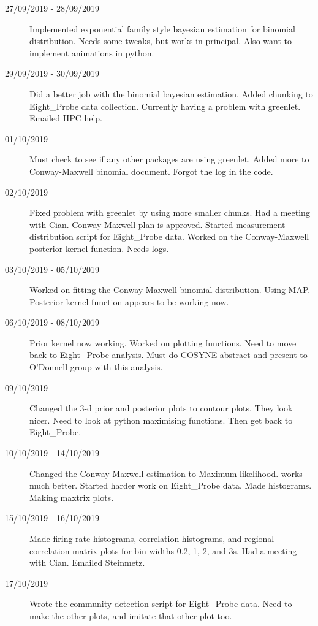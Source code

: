\documentclass[a4paper,12pt]{article}
\theoremstyle{definition}
\begin{document}
\begin{description}
	\item[27/09/2019 - 28/09/2019] Implemented exponential family style bayesian estimation for binomial distribution. Needs some tweaks, but works in principal. Also want to implement animations in python.

	\item[29/09/2019 - 30/09/2019] Did a better job with the binomial bayesian estimation. Added chunking to Eight\_Probe data collection. Currently having a problem with greenlet. Emailed HPC help.

	\item[01/10/2019] Must check to see if any other packages are using greenlet. Added more to Conway-Maxwell binomial document. Forgot the log in the code.

	\item[02/10/2019] Fixed problem with greenlet by using more smaller chunks. Had a meeting with Cian. Conway-Maxwell plan is approved. Started measurement distribution script for Eight\_Probe data. Worked on the Conway-Maxwell posterior kernel function. Needs logs.

	\item[03/10/2019 - 05/10/2019] Worked on fitting the Conway-Maxwell binomial distribution. Using MAP. Posterior kernel function appears to be working now.

	\item[06/10/2019 - 08/10/2019] Prior kernel now working. Worked on plotting functions. Need to move back to Eight\_Probe analysis. Must do COSYNE abstract and present to O'Donnell group with this analysis.

	\item[09/10/2019] Changed the 3-d prior and posterior plots to contour plots. They look nicer. Need to look at python maximising functions. Then get back to Eight\_Probe.

	\item[10/10/2019 - 14/10/2019] Changed the Conway-Maxwell estimation to Maximum likelihood. works much better. Started harder work on Eight\_Probe data. Made histograms. Making maxtrix plots.

	\item[15/10/2019 - 16/10/2019] Made firing rate histograms, correlation histograms, and regional correlation matrix plots for bin widths 0.2, 1, 2, and 3s. Had a meeting with Cian. Emailed Steinmetz.

	\item[17/10/2019] Wrote the community detection script for Eight\_Probe data. Need to make the other plots, and imitate that other plot too.


\end{description}
\end{document}

